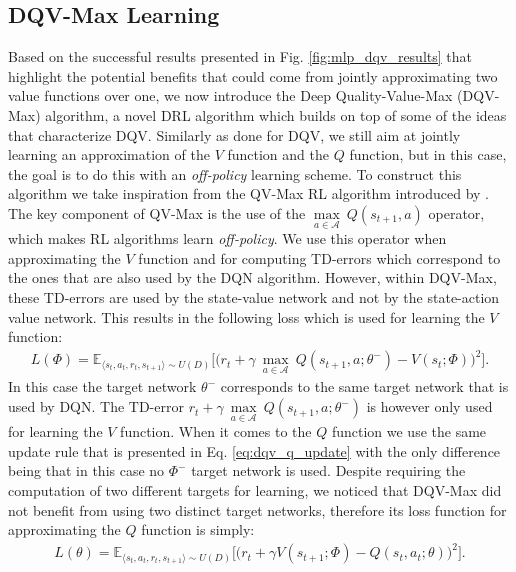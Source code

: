 \subsection{DQV-Max Learning}
Based on the successful results presented in Fig. \ref{fig:mlp_dqv_results} that highlight the potential benefits that could come from jointly approximating two value functions over one, we now introduce the Deep Quality-Value-Max (DQV-Max) algorithm, a novel DRL algorithm which builds on top of some of the ideas that characterize DQV. Similarly as done for DQV, we still aim at jointly learning an approximation of the $V$ function and the $Q$ function, but in this case, the goal is to do this with an \textit{off-policy} learning scheme. To construct this algorithm we take inspiration from the QV-Max RL algorithm introduced by \citet{wiering2009qv}. The key component of QV-Max is the use of the $\underset{a\in \mathcal{A}}{\max}\: Q(s_{t+1}, a)$ operator, which makes RL algorithms learn \textit{off-policy}. We use this operator when approximating the $V$ function and for computing TD-errors which correspond to the ones that are also used by the DQN algorithm. However, within DQV-Max, these TD-errors are used by the state-value network and not by the state-action value network. This results in the following loss which is used for learning the $V$ function:
\begin{multline}
L(\Phi) = \mathds{E}_{\langle s_{t},a_{t},r_{t},s_{t+1}\rangle\sim U(D)} \bigg[\big(r_{t} + \gamma \: \underset{a\in \mathcal{A}}{\max}\: Q(s_{t+1}, a; \theta^{-}) - V(s_{t}; \Phi)\big)^{2}\bigg].
\label{eq:dqv_max_v}
\end{multline}
In this case the target network $\theta^{-}$ corresponds to the same target network that is used by DQN. The TD-error $r_{t} + \gamma \: \underset{a\in \mathcal{A}}{\max}\: Q(s_{t+1}, a; \theta^{-})$ is however only used for learning the $V$ function. When it comes to the $Q$ function we use the same update rule that is presented in Eq. \ref{eq:dqv_q_update} with the only difference being that in this case no $\Phi^{-}$ target network is used. Despite requiring the computation of two different targets for learning, we noticed that DQV-Max did not benefit from using two distinct target networks, therefore its loss function for approximating the $Q$ function is simply:
\begin{multline}
    L(\theta) = \mathds{E}_{\langle s_{t},a_{t},r_{t},s_{t+1}\rangle\sim U(D)} \bigg[\big(r_{t} + \gamma V(s_{t+1}; \Phi) - Q(s_{t}, a_{t}; \theta)\big)^{2}\bigg].
    \label{eq:dqv_max_q}
\end{multline}


